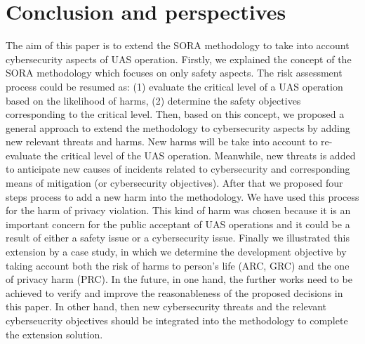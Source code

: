 \documentclass[a4paper, 10, conference]{ieeeconf}  %
\begin{document}
\section{Conclusion and perspectives} \label{sec:con}
The aim of this paper is to extend the SORA methodology to take into account cybersecurity aspects of UAS operation.
Firstly, we explained the concept of the SORA methodology which focuses on only safety aspects. The risk assessment process could be resumed as: (1) evaluate the critical level of a UAS operation based on the likelihood of harms, (2) determine the safety objectives corresponding to the critical level. Then, based on this concept, we proposed a general approach to extend the methodology to cybersecurity aspects by adding new relevant threats and harms. New harms will be take into account to re-evaluate the critical level of the UAS operation. Meanwhile, new threats is added to anticipate new causes of incidents related to cybersecurity and corresponding means of mitigation (or cybersecurity objectives). After that we proposed four steps process to add a new harm into the methodology. We have used this process for the harm of privacy violation. This kind of harm was chosen because it is an important concern for the public acceptant of UAS operations and it could be a result of either a safety issue or a cybersecurity issue. Finally we illustrated this extension by a case study, in which we determine the development objective by taking account both the risk of harms to person's life (ARC, GRC) and the one of privacy harm (PRC). In the future, in one hand, the further works need to be achieved to verify and improve the reasonableness of the proposed decisions in this paper. In other hand, then new cybersecurity threats and the relevant cyberseucrity objectives should be integrated into the methodology to complete the extension solution.





\end{document}
